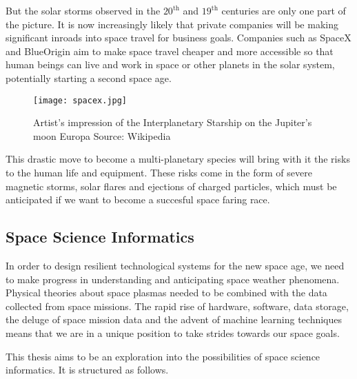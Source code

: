 But the solar storms observed in the $20^{\text{th}}$ and $19^{\text{th}}$ centuries are only one part of the 
picture. It is now increasingly likely that private companies will be making significant inroads into space 
travel for business goals. Companies such as SpaceX and BlueOrigin aim to make space travel cheaper and more 
accessible so that human beings can live and work in space or other planets in the solar system, potentially 
starting a second space age.


\begin{wrapfigure}{l}{0.4\textwidth}
    \centering\texttt{[image: spacex.jpg]}
    \caption{
        \small Artist's impression of the Interplanetary Starship on the Jupiter's moon Europa Source: Wikipedia}
    \label{fig:induction}
\end{wrapfigure}

This drastic move to become a multi-planetary species will bring with it the risks to the human life and equipment. 
These risks come in the form of severe magnetic storms, solar flares and ejections of charged particles, which must 
be anticipated if we want to become a succesful space faring race. 

\subsection*{Space Science Informatics}

In order to design resilient technological systems for the new space age, we need to make progress in understanding 
and anticipating space weather phenomena. Physical theories about space plasmas needed to be combined with the data 
collected from space missions. The rapid rise of hardware, software, data storage, the deluge of space mission data 
and the advent of machine learning techniques means that we are in a unique position to take strides towards our 
space goals.

This thesis aims to be an exploration into the possibilities of space science informatics. It is structured as follows.



\clearpage



